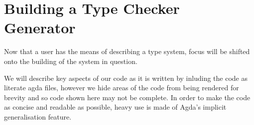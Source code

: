 \chapter{Building a Type Checker Generator}

Now that a user has the means of describing a type system, focus will
be shifted onto the building of the system in question.

We will describe key aspects of our code as it is written by inluding
the code as literate agda files, however we hide areas of the code
from being rendered for brevity and so code shown here may not be
complete. In order to make the code as concise and readable as
possible, heavy use is made of Agda's implicit generalisation feature.










